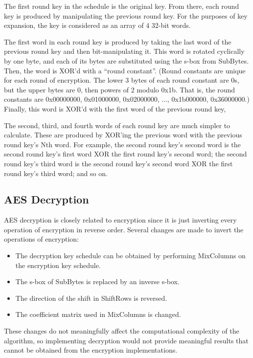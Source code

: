 \documentclass[a4paper,10pt,conference]{IEEEtran}
\begin{document}
The first round key in the schedule is the original key.  From there, each round key is produced by manipulating the previous round key.  For the purposes of key expansion, the key is considered as an array of 4 32-bit words.

The first word in each round key is produced by taking the last word of the previous round key and then bit-manipulating it.  This word is rotated cyclically by one byte, and each of its bytes are substituted using the s-box from SubBytes.  Then, the word is XOR'd with a ``round constant''.  (Round constants are unique for each round of encryption.  The lower 3 bytes of each round constant are 0s, but the upper bytes are 0, then powers of 2 modulo 0x1b.  That is, the round constants are 0x00000000, 0x01000000, 0x02000000, ..., 0x1b000000, 0x36000000.)  Finally, this word is XOR'd with the first word of the previous round key,

The second, third, and fourth words of each round key are much simpler to calculate.  These are produced by XOR'ing the previous word with the previous round key's Nth word.  For example, the second round key's second word is the second round key's first word XOR the first round key's second word; the second round key's third word is the second round key's second word XOR the first round key's third word; and so on.

\subsection{AES Decryption}

AES decryption is closely related to encryption since it is just inverting every operation of encryption in reverse order.  Several changes are made to invert the operations of encryption:

\begin{itemize}
 \item The decryption key schedule can be obtained by performing MixColumns on the encryption key schedule.
 \item The s-box of SubBytes is replaced by an inverse s-box.
 \item The direction of the shift in ShiftRows is reversed.
 \item The coefficient matrix used in MixColumns is changed. 
\end{itemize}

These changes do not meaningfully affect the computational complexity of the algorithm, so implementing decryption would not provide meaningful results that cannot be obtained from the encryption implementations.
\end{document}
